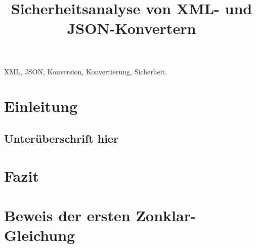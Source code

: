 \documentclass[conference]{template/IEEEtran}
\begin{document}
\title{Sicherheitsanalyse von XML- und JSON-Konvertern}
\author{
}
\maketitle
\begin{abstract}
\blindtext[1]
\end{abstract}
\begin{IEEEkeywords}
XML, JSON, Konversion, Konvertierung, Sicherheit.
\end{IEEEkeywords}
\IEEEpeerreviewmaketitle{}
\section{Einleitung}
\blindtext{}
\subsection{Unterüberschrift hier}
\blindtext{}
\section{Fazit}
\blindtext{}
\appendices{}
\section{Beweis der ersten Zonklar-Gleichung}
\blindtext{}
\ifCLASSOPTIONcaptionsoff{}
  \newpage
\fi
\printbibliography{}
\end{document}
